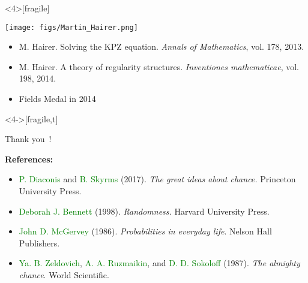 \documentclass[9pt,xcolor=dvipsnames,table]{beamer}
\begin{document}
\begin{frame}<4>[fragile] %
  \begin{minipage}{0.3\textwidth}
  \texttt{[image: figs/Martin\_Hairer.png]}
  \end{minipage}
  \begin{minipage}{0.65\textwidth}
    \pause
    \begin{itemize}
      \small
      \item \textcolor{refcolor}{M. Hairer}. Solving the KPZ equation. {\it Annals of Mathematics}, vol. 178, 2013.
        \bigskip
      \item \textcolor{refcolor}{M. Hairer}. A theory of regularity structures. {\it Inventiones mathematicae}, vol. 198, 2014.
        \bigskip
        \mySeparateLine
        \bigskip
      \item[]
        \begin{center}
          \Large
          Fields Medal in 2014
        \end{center}
    \end{itemize}
  \end{minipage}
\end{frame}
\begin{frame}<4->[fragile,t] %
  \vfill

 \begin{center}
   \huge

   Thank you~!

 \end{center}
 \vfill

 {\noindent \bf References:}\\
 \begin{itemize}
   \item \textcolor{green}{P. Diaconis} and \textcolor{green}{B. Skyrms} (2017). \textit{The great
     ideas about chance.} Princeton University Press.
   \item \textcolor{green}{Deborah J. Bennett} (1998). \textit{Randomness.} Harvard University
     Press.
   \item \textcolor{green}{John D. McGervey} (1986). \textit{Probabilities in everyday life}. Nelson
     Hall Publishers.
   \item \textcolor{green}{Ya. B. Zeldovich}, \textcolor{green}{A. A. Ruzmaikin}, and
     \textcolor{green}{D. D. Sokoloff} (1987). \textit{The almighty chance}. World Scientific.
 \end{itemize}

\end{frame}
\end{document}
